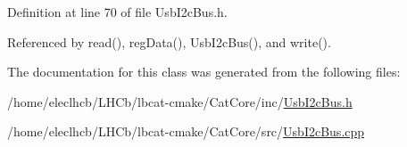 Definition at line 70 of file Usb\+I2c\+Bus.\+h.



Referenced by read(), reg\+Data(), Usb\+I2c\+Bus(), and write().



The documentation for this class was generated from the following files\+:\begin{DoxyCompactItemize}
\item 
/home/eleclhcb/\+L\+H\+Cb/lbcat-\/cmake/\+Cat\+Core/inc/\hyperlink{UsbI2cBus_8h}{Usb\+I2c\+Bus.\+h}\item 
/home/eleclhcb/\+L\+H\+Cb/lbcat-\/cmake/\+Cat\+Core/src/\hyperlink{UsbI2cBus_8cpp}{Usb\+I2c\+Bus.\+cpp}\end{DoxyCompactItemize}
